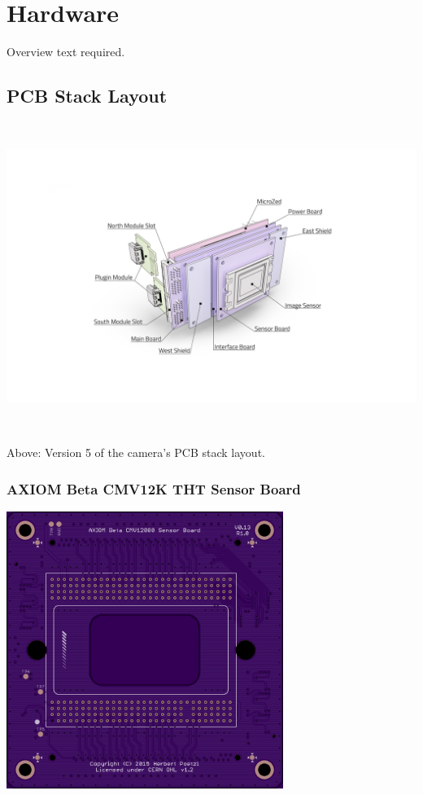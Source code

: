 \section{Hardware}

Overview text required.





\subsection{PCB Stack Layout}

\begin{center}
\includegraphics[height=10cm]{images/PCB_grey_new_pastel_labels-01}
\end{center}

Above: Version 5 of the camera's PCB stack layout.\\





\subsubsection{AXIOM Beta CMV12K THT Sensor Board}

\begin{center}
\includegraphics[height=9cm]{images/AXIOM_Beta_Sensor_THT_0.13_Top}
\end{center}

